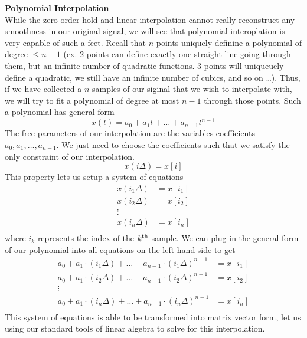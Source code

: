 \textbf{Polynomial Interpolation} \\
While the zero-order hold and linear interpolation cannot really reconstruct any smoothness in our original signal, we will see that polynomial interoplation is very capable of such a feet. Recall that $n$ points uniquely definine a polynomial of degree $\leq n - 1$ (ex. 2 points can define exactly one straight line going through them, but an infinite number of quadratic functions. 3 points will uniqueuely define a quadratic, we still have an infinite number of cubics, and so on \ldots). Thus, if we have collected a $n$ samples of our siginal that we wish to interpolate with, we will try to fit a polynomial of degree at most $n-1$ through those points. Such a polynomial has general form
\begin{equation*}
    x(t) = a_0 + a_1 t + \dots + a_{n-1} t^{n-1} 
\end{equation*}
The free parameters of our interpolation are the variables coefficients $a_0, a_1, \ldots, a_{n-1}$. We just need to choose the coefficients such that we satisfy the only constraint of our interpolation.
\begin{equation*}
    x(i \Delta) = x[i]
\end{equation*}
This property lets us setup a system of equations
\begin{align*}
x(i_1 \Delta) &= x[i_1] \\
x(i_2 \Delta) &= x[i_2] \\
\vdots \\
x(i_n \Delta) &= x[i_n] \\
\end{align*}
where $i_k$ represents the index of the $k\textsuperscript{th}$ sample.
\newline
We can plug in the general form of our polynomial into all equations on the left hand side to get
\begin{align*}
a_0 + a_1 \cdot (i_1 \Delta) + \dots + a_{n-1} \cdot (i_1 \Delta)^{n-1} &= x[i_1] \\
a_0 + a_1 \cdot (i_2 \Delta) + \dots + a_{n-1} \cdot (i_2 \Delta)^{n-1} &= x[i_2] \\
\vdots \\
a_0 + a_1 \cdot (i_n \Delta) + \dots + a_{n-1} \cdot (i_n \Delta)^{n-1} &= x[i_n] \\
\end{align*}
This system of equations is able to be transformed into matrix vector form, let us using our standard tools of linear algebra to solve for this interpolation.
